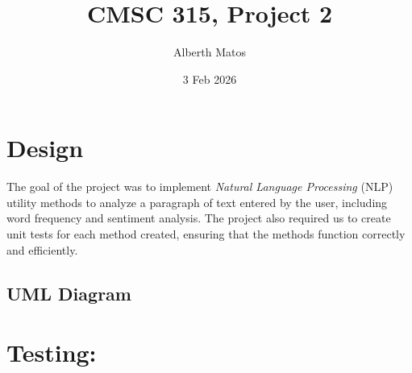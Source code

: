 \documentclass{scrartcl}
\title{CMSC 315, Project 2}
\author{Alberth Matos}
\date{3 Feb 2026}
\begin{document}
\maketitle
\tableofcontents
\thispagestyle{empty}
\newpage
\section{Design}
The goal of the project was to implement \emph{Natural Language Processing}
(NLP) utility methods to analyze a paragraph of text entered by the user,
including word frequency and sentiment analysis.  The project also required
us to create unit tests for each method created, ensuring that the methods
function correctly and efficiently.

\subsection{UML Diagram}

\newpage
\section{Testing:}
\end{document}

